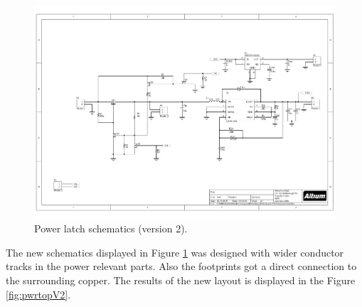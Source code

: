 \begin{figure}[ht]
	\centering
	\includegraphics[clip, trim=4cm 5cm 1cm 3cm, width=1\textwidth]{4-development/hardware/graphics/PowerLatch/PwrLatch_V2_sch.pdf}
	\caption{Power latch schematics (version 2).\label{development:scematicV2}}
\end{figure}
The new schematics displayed in Figure \ref{development:scematicV2} was designed with wider conductor tracks in the power relevant parts.
Also the footprints got a direct connection to the surrounding copper.
The results of the new layout is displayed in the Figure \ref{fig:pwrtopV2}.

